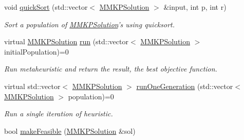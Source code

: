 \begin{DoxyCompactItemize}
\item 
void \hyperlink{class_m_m_k_p___meta_heuristic_a50620ef703c591e1ad5bc8f1fc3ae560}{quick\+Sort} (std\+::vector$<$ \hyperlink{class_m_m_k_p_solution}{M\+M\+K\+P\+Solution} $>$ \&input, int p, int r)
\begin{DoxyCompactList}\small\item\em Sort a population of \hyperlink{class_m_m_k_p_solution}{M\+M\+K\+P\+Solution}'s using quicksort. \end{DoxyCompactList}\item 
\hypertarget{class_m_m_k_p___meta_heuristic_ae8ed322572fd644d1332304c07b188a0}{virtual \hyperlink{class_m_m_k_p_solution}{M\+M\+K\+P\+Solution} \hyperlink{class_m_m_k_p___meta_heuristic_ae8ed322572fd644d1332304c07b188a0}{run} (std\+::vector$<$ \hyperlink{class_m_m_k_p_solution}{M\+M\+K\+P\+Solution} $>$ initial\+Population)=0}\label{class_m_m_k_p___meta_heuristic_ae8ed322572fd644d1332304c07b188a0}

\begin{DoxyCompactList}\small\item\em Run metaheuristic and return the result, the best objective function. \end{DoxyCompactList}\item 
\hypertarget{class_m_m_k_p___meta_heuristic_acd216490366b42ae6e44c2a7818a47a4}{virtual std\+::vector$<$ \hyperlink{class_m_m_k_p_solution}{M\+M\+K\+P\+Solution} $>$ \hyperlink{class_m_m_k_p___meta_heuristic_acd216490366b42ae6e44c2a7818a47a4}{run\+One\+Generation} (std\+::vector$<$ \hyperlink{class_m_m_k_p_solution}{M\+M\+K\+P\+Solution} $>$ population)=0}\label{class_m_m_k_p___meta_heuristic_acd216490366b42ae6e44c2a7818a47a4}

\begin{DoxyCompactList}\small\item\em Run a single iteration of heuristic. \end{DoxyCompactList}\item 
\hypertarget{class_m_m_k_p___meta_heuristic_aef411efa1ce1674cb8c16966de476084}{bool \hyperlink{class_m_m_k_p___meta_heuristic_aef411efa1ce1674cb8c16966de476084}{make\+Feasible} (\hyperlink{class_m_m_k_p_solution}{M\+M\+K\+P\+Solution} \&sol)}\label{class_m_m_k_p___meta_heuristic_aef411efa1ce1674cb8c16966de476084}


\end{DoxyCompactItemize}
